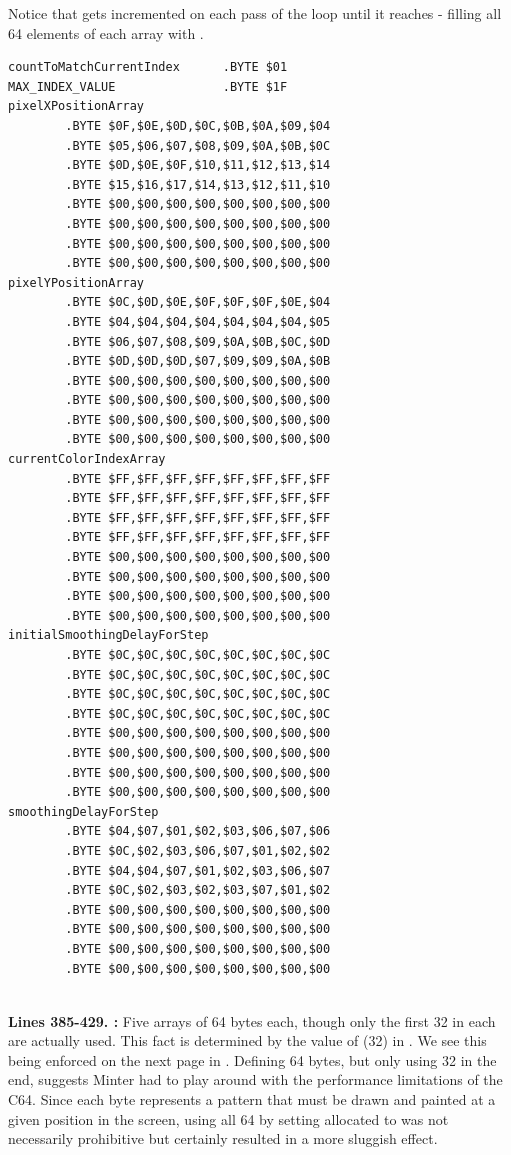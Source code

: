 Notice that  gets incremented on each pass of the loop until it reaches  - filling all 64 elements of each array with
.
\clearpage
\begin{lstlisting}
countToMatchCurrentIndex      .BYTE $01
MAX_INDEX_VALUE               .BYTE $1F
pixelXPositionArray   
        .BYTE $0F,$0E,$0D,$0C,$0B,$0A,$09,$04
        .BYTE $05,$06,$07,$08,$09,$0A,$0B,$0C
        .BYTE $0D,$0E,$0F,$10,$11,$12,$13,$14
        .BYTE $15,$16,$17,$14,$13,$12,$11,$10
        .BYTE $00,$00,$00,$00,$00,$00,$00,$00
        .BYTE $00,$00,$00,$00,$00,$00,$00,$00
        .BYTE $00,$00,$00,$00,$00,$00,$00,$00
        .BYTE $00,$00,$00,$00,$00,$00,$00,$00
pixelYPositionArray   
        .BYTE $0C,$0D,$0E,$0F,$0F,$0F,$0E,$04
        .BYTE $04,$04,$04,$04,$04,$04,$04,$05
        .BYTE $06,$07,$08,$09,$0A,$0B,$0C,$0D
        .BYTE $0D,$0D,$0D,$07,$09,$09,$0A,$0B
        .BYTE $00,$00,$00,$00,$00,$00,$00,$00
        .BYTE $00,$00,$00,$00,$00,$00,$00,$00
        .BYTE $00,$00,$00,$00,$00,$00,$00,$00
        .BYTE $00,$00,$00,$00,$00,$00,$00,$00
currentColorIndexArray   
        .BYTE $FF,$FF,$FF,$FF,$FF,$FF,$FF,$FF
        .BYTE $FF,$FF,$FF,$FF,$FF,$FF,$FF,$FF
        .BYTE $FF,$FF,$FF,$FF,$FF,$FF,$FF,$FF
        .BYTE $FF,$FF,$FF,$FF,$FF,$FF,$FF,$FF
        .BYTE $00,$00,$00,$00,$00,$00,$00,$00
        .BYTE $00,$00,$00,$00,$00,$00,$00,$00
        .BYTE $00,$00,$00,$00,$00,$00,$00,$00
        .BYTE $00,$00,$00,$00,$00,$00,$00,$00
initialSmoothingDelayForStep   
        .BYTE $0C,$0C,$0C,$0C,$0C,$0C,$0C,$0C
        .BYTE $0C,$0C,$0C,$0C,$0C,$0C,$0C,$0C
        .BYTE $0C,$0C,$0C,$0C,$0C,$0C,$0C,$0C
        .BYTE $0C,$0C,$0C,$0C,$0C,$0C,$0C,$0C
        .BYTE $00,$00,$00,$00,$00,$00,$00,$00
        .BYTE $00,$00,$00,$00,$00,$00,$00,$00
        .BYTE $00,$00,$00,$00,$00,$00,$00,$00
        .BYTE $00,$00,$00,$00,$00,$00,$00,$00
smoothingDelayForStep   
        .BYTE $04,$07,$01,$02,$03,$06,$07,$06
        .BYTE $0C,$02,$03,$06,$07,$01,$02,$02
        .BYTE $04,$04,$07,$01,$02,$03,$06,$07
        .BYTE $0C,$02,$03,$02,$03,$07,$01,$02
        .BYTE $00,$00,$00,$00,$00,$00,$00,$00
        .BYTE $00,$00,$00,$00,$00,$00,$00,$00
        .BYTE $00,$00,$00,$00,$00,$00,$00,$00
        .BYTE $00,$00,$00,$00,$00,$00,$00,$00


\end{lstlisting}
\clearpage

\textbf{Lines 385-429. :} Five arrays of 64 bytes each, though only the first 32 in each are actually used. This fact is determined
by the value of  (32) in . We see this being enforced on the next page in
. Defining 64 bytes, but only using 32 in the end, suggests Minter had to play around
with the performance limitations of the C64. Since each byte represents a pattern that must be drawn and painted
at a given position in the screen, using all 64 by setting allocated  to  
was not necessarily prohibitive but certainly resulted in a more sluggish effect.

